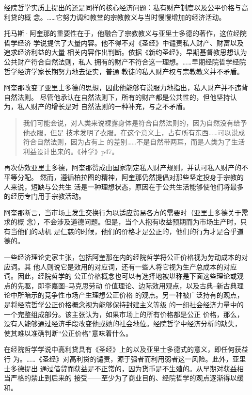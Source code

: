 经院哲学实质上提出的还是同样的核心经济问题：私有财产制度以及公平价格与高利贷的概
念。……它努力调和教堂的宗教教义与当时慢慢增加的经济活动。

托马斯·阿奎那的重要性在于，他融合了宗教教义与亚里士多德的著作，这位经院哲学经济
学说提供了大量内容。他不得不对《圣经》中谴责私人财产、财富以及追求经济利益的大量
相关内容作出判断。依据《新约圣经》，早期基督教思想认为公共财产符合自然法则，私人
拥有的财产不符合这一理想。……早期经院哲学经院哲学经济学家长期努力地去证实，普通
教徒的私人财产权与宗教教义并不矛盾。

阿奎那改变了亚里士多德的思想，因此他能够有说服力地指出，私人财产并不违背自然法则。
尽管他承认在自然法则下，所有的财产都是公共性的，但他坚持认为，私人财产的增长是对
自然法则的一种补充，与之不矛盾。

\begin{quotation}
  我们可能会说，对人类来说裸露身体是符合自然法则的，因为自然没有给予他衣服，但是
  技术发明了衣服。在这个意义上，占有所有东西……可以说成符合自然法则，因为占有上
  的差别……不是自然带两耳，而是人类为了生活利益设计出来的。《神学》p47。
\end{quotation}

再次仿效亚里士多德，阿奎那赞成由国家制定私人财产规则，并认可私人财产的不平等分配。
然而，遵循柏拉图的精神，阿奎那仍然提倡对那些坚定投身于宗教的人来说，短缺与公共生
活是一种理想状态，原因在于公共生活能够使他们将最多的经历专门用于宗教活动。

阿奎那断言，当市场上发生交换行为以适应贸易各方的需要时（亚里士多德关于需求的概
念），不会涉及道德问题。但是，当个人抱有收益预期而为市场生产时，只有当他们的动机
是仁慈的时候，他们的价格才是公正的，他们的行为才是合乎道德的。

一些经济理论史家主张，包括阿奎那在内的经院哲学将公正价格视为劳动成本的对应词。其
他人则说它是效用的对应词，还有一些人将它视为生产总成本的对应词。因此，经院哲学的
公正价格概念也可以有选择地被堪称是下面这些理论或观点的先驱，即李嘉图--马克思劳动
价值理论、边际效用观点，以及古典--新古典理论中所暗示的竞争性市场产生理想公正价格
的观点。另一种被广泛持有的观点，是将经院哲学公正价格概念视为能够保持封建主义等级
的一组社会经济力量中的一个完整组成部分。该主张认为，如果市场上的所有价格都是公正
价格，那么，没有人能够通过经济手段改变他或她的社会地位。经院哲学中经济分析的缺失，
使其难以准确判断“公正价格”意味着什么。

在经院哲学学说中高利贷具有《圣经》上的以及亚里士多德式的意义，即任何获益行
为。……《圣经》对高利贷的谴责，源于强者而利用弱者这一风险。此外，亚里士多德提出
通过借贷而获益是不正常的，因为货币是不生殖的。从早期对获益相当严格的禁止到后来的
接受——至少为了商业目的、经院哲学的观点逐渐得以缓和。

